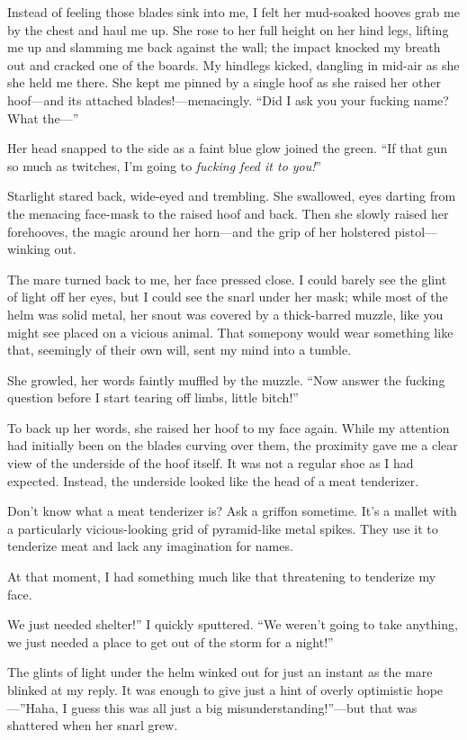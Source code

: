 Instead of feeling those blades sink into me, I felt her mud-soaked hooves grab me by the chest and haul me up. She rose to her full height on her hind legs, lifting me up and slamming me back against the wall; the impact knocked my breath out and cracked one of the boards. My hindlegs kicked, dangling in mid-air as she she held me there. She kept me pinned by a single hoof as she raised her other hoof—and its attached blades!—menacingly. “Did I ask you your fucking name? What the—”

Her head snapped to the side as a faint blue glow joined the green. “If that gun so much as twitches, I’m going to \textit{fucking feed it to you!}”

Starlight stared back, wide-eyed and trembling. She swallowed, eyes darting from the menacing face-mask to the raised hoof and back. Then she slowly raised her forehooves, the magic around her horn—and the grip of her holstered pistol—winking out.

The mare turned back to me, her face pressed close. I could barely see the glint of light off her eyes, but I could see the snarl under her mask; while most of the helm was solid metal, her snout was covered by a thick-barred muzzle, like you might see placed on a vicious animal. That somepony would wear something like that, seemingly of their own will, sent my mind into a tumble.

She growled, her words faintly muffled by the muzzle. “Now answer the fucking question before I start tearing off limbs, little bitch!”

To back up her words, she raised her hoof to my face again. While my attention had initially been on the blades curving over them, the proximity gave me a clear view of the underside of the hoof itself. It was not a regular shoe as I had expected. Instead, the underside looked like the head of a meat tenderizer.

Don’t know what a meat tenderizer is? Ask a griffon sometime. It’s a mallet with a particularly vicious-looking grid of pyramid-like metal spikes. They use it to tenderize meat and lack any imagination for names.

At that moment, I had something much like that threatening to tenderize my face.

\leavevmode{}We just needed shelter!” I quickly sputtered. “We weren’t going to take anything, we just needed a place to get out of the storm for a night!”

The glints of light under the helm winked out for just an instant as the mare blinked at my reply. It was enough to give just a hint of overly optimistic hope—”Haha, I guess this was all just a big misunderstanding!”—but that was shattered when her snarl grew.

